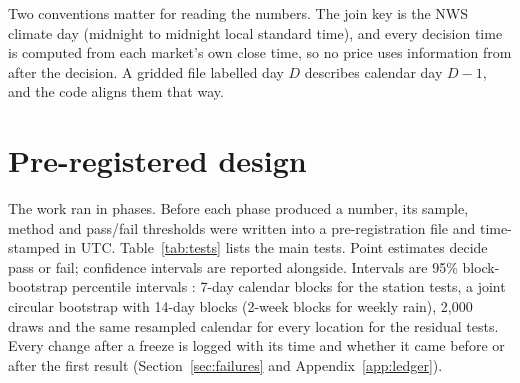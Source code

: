 \documentclass[11pt]{article}
\begin{document}
Two conventions matter for reading the numbers. The join key is the NWS climate day (midnight to midnight local standard time), and every decision time is computed from each market's own close time, so no price uses information from after the decision. A gridded file labelled day $D$ describes calendar day $D-1$, and the code aligns them that way.

\section{Pre-registered design}
\label{sec:prereg}

The work ran in phases. Before each phase produced a number, its sample, method and pass/fail thresholds were written into a pre-registration file and time-stamped in UTC. Table~\ref{tab:tests} lists the main tests. Point estimates decide pass or fail; confidence intervals are reported alongside. Intervals are 95\% block-bootstrap percentile intervals \citep{kunsch1989,politis1992}: 7-day calendar blocks for the station tests, a joint circular bootstrap with 14-day blocks (2-week blocks for weekly rain), 2,000 draws and the same resampled calendar for every location for the residual tests. Every change after a freeze is logged with its time and whether it came before or after the first result (Section~\ref{sec:failures} and Appendix~\ref{app:ledger}).
\end{document}
